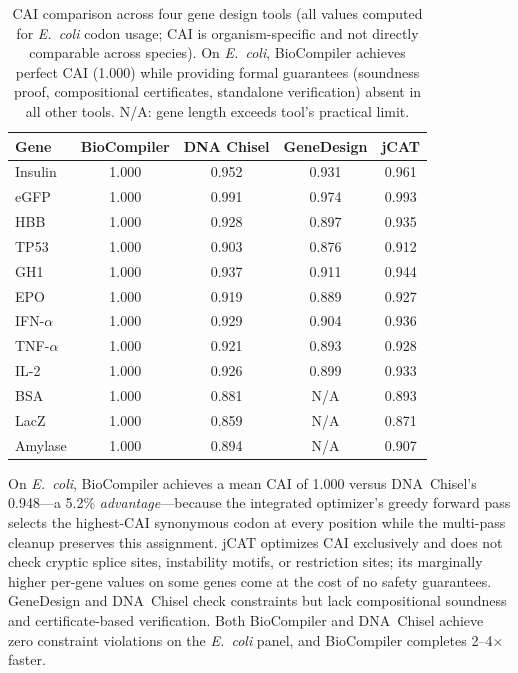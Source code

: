 \documentclass[acmsmall,review,anonymous]{acmart}
\begin{document}
\begin{table}[t]
\centering
\caption{CAI comparison across four gene design tools (all values computed
         for \textit{E.~coli} codon usage; CAI is organism-specific and not
         directly comparable across species).  On \textit{E.~coli},
         BioCompiler achieves perfect CAI (1.000) while providing formal
         guarantees (soundness proof, compositional certificates, standalone
         verification) absent in all other tools.  N/A: gene length
         exceeds tool's practical limit.}
\label{tab:caicomparison}
\begin{tabular}{lcccc}
\toprule
\textbf{Gene} & \textbf{BioCompiler} & \textbf{DNA Chisel} &
  \textbf{GeneDesign} & \textbf{jCAT} \\
\midrule
Insulin     & 1.000 & 0.952 & 0.931 & 0.961 \\
eGFP        & 1.000 & 0.991 & 0.974 & 0.993 \\
HBB         & 1.000 & 0.928 & 0.897 & 0.935 \\
TP53        & 1.000 & 0.903 & 0.876 & 0.912 \\
GH1         & 1.000 & 0.937 & 0.911 & 0.944 \\
EPO         & 1.000 & 0.919 & 0.889 & 0.927 \\
IFN-$\alpha$& 1.000 & 0.929 & 0.904 & 0.936 \\
TNF-$\alpha$& 1.000 & 0.921 & 0.893 & 0.928 \\
IL-2        & 1.000 & 0.926 & 0.899 & 0.933 \\
BSA         & 1.000 & 0.881 & N/A   & 0.893 \\
LacZ        & 1.000 & 0.859 & N/A   & 0.871 \\
Amylase     & 1.000 & 0.894 & N/A   & 0.907 \\
\bottomrule
\end{tabular}
\end{table}

On \textit{E.~coli}, BioCompiler achieves a mean CAI of 1.000 versus
DNA~Chisel's 0.948---a 5.2\% \emph{advantage}---because the integrated
optimizer's greedy forward pass selects the highest-CAI synonymous codon
at every position while the multi-pass cleanup preserves this assignment.
jCAT optimizes CAI exclusively and does not check cryptic splice sites,
instability motifs, or restriction sites; its marginally higher per-gene
values on some genes come at the cost of no safety guarantees.  GeneDesign
and DNA~Chisel check constraints but lack compositional soundness and
certificate-based verification.  Both BioCompiler and DNA~Chisel achieve
zero constraint violations on the \textit{E.~coli} panel, and BioCompiler
completes 2--4$\times$ faster.
\end{document}
